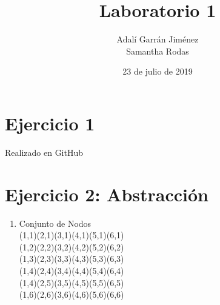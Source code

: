 \documentclass{article}
\title{\huge{Laboratorio 1}}
\author{Adalí Garrán Jiménez\\
Samantha Rodas}
\date{23 de julio de 2019}
\begin{document}
\maketitle
\section*{Ejercicio 1}
Realizado en GitHub
\section*{Ejercicio 2: Abstracción}
\begin{enumerate}
    \item Conjunto de Nodos\\
(1,1)\qquad	(2,1)\qquad	(3,1)\qquad	(4,1)\qquad	(5,1)\qquad	(6,1)\\
(1,2)\qquad	(2,2)\qquad	(3,2)\qquad	(4,2)\qquad	(5,2)\qquad	(6,2)\\
(1,3)\qquad	(2,3)\qquad	(3,3)\qquad	(4,3)\qquad	(5,3)\qquad	(6,3)\\
(1,4)\qquad	(2,4)\qquad	(3,4)\qquad	(4,4)\qquad	(5,4)\qquad	(6,4)\\
(1,4)\qquad	(2,5)\qquad	(3,5)\qquad	(4,5)\qquad	(5,5)\qquad	(6,5)\\
(1,6)\qquad	(2,6)\qquad	(3,6)\qquad	(4,6)\qquad	(5,6)\qquad	(6,6)\\


\end{enumerate}
\end{document}
